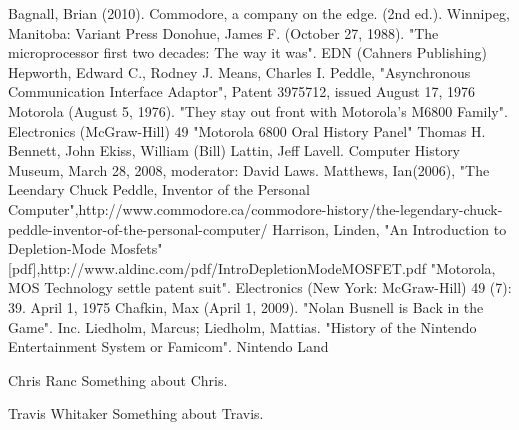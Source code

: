 \documentclass[journal]{IEEEtran}
\begin{document}
\begin{thebibliography}{1}

Bagnall, Brian (2010). Commodore, a company on the edge. (2nd ed.). Winnipeg, Manitoba: Variant Press
Donohue, James F. (October 27, 1988). "The microprocessor first two decades: The way it was". EDN (Cahners Publishing) 
Hepworth, Edward C., Rodney J. Means, Charles I. Peddle, "Asynchronous Communication Interface Adaptor", Patent 3975712, issued August 17, 1976
Motorola (August 5, 1976). "They stay out front with Motorola's M6800 Family". Electronics (McGraw-Hill) 49
"Motorola 6800 Oral History Panel" Thomas H. Bennett, John Ekiss, William (Bill) Lattin, Jeff Lavell. Computer History Museum, March 28, 2008, moderator: David Laws.
Matthews, Ian(2006), "The Leendary Chuck Peddle, Inventor of the Personal Computer",http://www.commodore.ca/commodore-history/the-legendary-chuck-peddle-inventor-of-the-personal-computer/
Harrison, Linden, "An Introduction to Depletion-Mode Mosfets"[pdf],http://www.aldinc.com/pdf/IntroDepletionModeMOSFET.pdf
"Motorola, MOS Technology settle patent suit". Electronics (New York: McGraw-Hill) 49 (7): 39. April 1, 1975
Chafkin, Max (April 1, 2009). "Nolan Busnell is Back in the Game". Inc.
Liedholm, Marcus; Liedholm, Mattias. "History of the Nintendo Entertainment System or Famicom". Nintendo Land


\end{thebibliography}

\begin{IEEEbiographynophoto}{Chris Ranc}
Something about Chris.
\end{IEEEbiographynophoto}

\begin{IEEEbiographynophoto}{Travis Whitaker}
Something about Travis.
\end{IEEEbiographynophoto}
\end{document}
